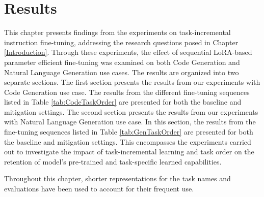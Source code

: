 \chapter{Results} %

\label{Results}

This chapter presents findings from the experiments on task-incremental instruction fine-tuning, addressing the research questions posed in Chapter \ref{Introduction}. Through these experiments, the effect of sequential LoRA-based parameter efficient fine-tuning was examined on both Code Generation and Natural Language Generation use cases. The results are organized into two separate sections. The first section presents the results from our experiments with Code Generation use case. The results from the different fine-tuning sequences listed in Table \ref{tab:CodeTaskOrder} are presented for both the baseline and mitigation settings. The second section presents the results from our experiments with Natural Language Generation use case. In this section, the results from the fine-tuning sequences listed in Table \ref{tab:GenTaskOrder} are presented for both the baseline and mitigation settings. This encompasses the experiments carried out to investigate the impact of task-incremental learning and task order on the retention of model's pre-trained and task-specific learned capabilities. 

Throughout this chapter, shorter representations for the task names and evaluations have been used to account for their frequent use.
\\

